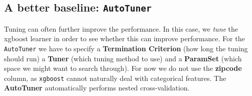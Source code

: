\documentclass[
  11pt,
  parskip=half,
  DIV=calc,
  BCOR=10mm,
  x11names]{scrbook}
\begin{document}
\hypertarget{a-better-baseline-autotuner}{%
\subsection{\texorpdfstring{A better baseline: \texttt{AutoTuner}}{A better baseline: AutoTuner}}\label{a-better-baseline-autotuner}}

Tuning can often further improve the performance.
In this case, we \emph{tune} the xgboost learner in order to see whether this can improve performance.
For the \texttt{AutoTuner} we have to specify a \textbf{Termination Criterion} (how long the tuning should run) a \textbf{Tuner} (which tuning method to use) and a \textbf{ParamSet} (which space we might want to search through).
For now we do not use the \textbf{zipcode} column, as \texttt{xgboost} cannot naturally
deal with categorical features.
The \textbf{AutoTuner} automatically performs nested cross-validation.
\end{document}
